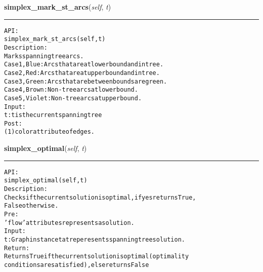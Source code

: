     \label{coinor:gimpy:graph:Graph:simplex_mark_st_arcs}

    \vspace{0.5ex}

\hspace{.8\funcindent}\begin{boxedminipage}{\funcwidth}

    \raggedright \textbf{simplex\_mark\_st\_arcs}(\textit{self}, \textit{t})

    \vspace{-1.5ex}

    \rule{\textwidth}{0.5\fboxrule}
\setlength{\parskip}{2ex}
\begin{alltt}

API:
    simplex\_mark\_st\_arcs(self, t)
Description:
    Marks spanning tree arcs.
    Case 1, Blue: Arcs that are at lower bound and in tree.
    Case 2, Red: Arcs that are at upper bound and in tree.
    Case 3, Green: Arcs that are between bounds are green.
    Case 4, Brown: Non-tree arcs at lower bound.
    Case 5, Violet: Non-tree arcs at upper bound.
Input:
    t: t is the current spanning tree
Post:
    (1) color attribute of edges.
\end{alltt}

\setlength{\parskip}{1ex}
    \end{boxedminipage}

    \label{coinor:gimpy:graph:Graph:simplex_optimal}

    \vspace{0.5ex}

\hspace{.8\funcindent}\begin{boxedminipage}{\funcwidth}

    \raggedright \textbf{simplex\_optimal}(\textit{self}, \textit{t})

    \vspace{-1.5ex}

    \rule{\textwidth}{0.5\fboxrule}
\setlength{\parskip}{2ex}
\begin{alltt}

API:
    simplex\_optimal(self, t)
Description:
    Checks if the current solution is optimal, if yes returns True,
    False otherwise.
Pre:
    'flow' attributes represents a solution.
Input:
    t: Graph instance tat reperesents spanning tree solution.
Return:
    Returns True if the current solution is optimal (optimality
    conditions are satisfied), else returns False
\end{alltt}

\setlength{\parskip}{1ex}
    \end{boxedminipage}

